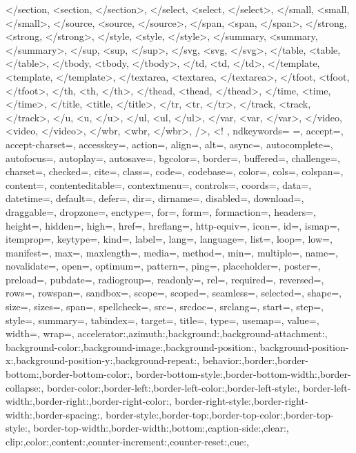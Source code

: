 {{    </section, <section, </section>,
    </select, <select, </select>,
    </small, <small, </small>,
    </source, <source, </source>,
    </span, <span, </span>,
    </strong, <strong, </strong>,
    </style, <style, </style>,
    </summary, <summary, </summary>,
    </sup, <sup, </sup>,
    </svg, <svg, </svg>,
    </table, <table, </table>,
    </tbody, <tbody, </tbody>,
    </td, <td, </td>,
    </template, <template, </template>,
    </textarea, <textarea, </textarea>,
    </tfoot, <tfoot, </tfoot>,
    </th, <th, </th>,
    </thead, <thead, </thead>,
    </time, <time, </time>,
    </title, <title, </title>,
    </tr, <tr, </tr>,
    </track, <track, </track>,
    </u, <u, </u>,
    </ul, <ul, </ul>,
    </var, <var, </var>,
    </video, <video, </video>,
    </wbr, <wbr, </wbr>,
    />, <!
    },  
    ndkeywords={
    =,
    accept=, accept-charset=, accesskey=, action=, align=, alt=, async=, autocomplete=, autofocus=, autoplay=, autosave=, bgcolor=, border=, buffered=, challenge=, charset=, checked=, cite=, class=, code=, codebase=, color=, cols=, colspan=, content=, contenteditable=, contextmenu=, controls=, coords=, data=, datetime=, default=, defer=, dir=, dirname=, disabled=, download=, draggable=, dropzone=, enctype=, for=, form=, formaction=, headers=, height=, hidden=, high=, href=, hreflang=, http-equiv=, icon=, id=, ismap=, itemprop=, keytype=, kind=, label=, lang=, language=, list=, loop=, low=, manifest=, max=, maxlength=, media=, method=, min=, multiple=, name=, novalidate=, open=, optimum=, pattern=, ping=, placeholder=, poster=, preload=, pubdate=, radiogroup=, readonly=, rel=, required=, reversed=, rows=, rowspan=, sandbox=, scope=, scoped=, seamless=, selected=, shape=, size=, sizes=, span=, spellcheck=, src=, srcdoc=, srclang=, start=, step=, style=, summary=, tabindex=, target=, title=, type=, usemap=, value=, width=, wrap=,
    accelerator:,azimuth:,background:,background-attachment:,
    background-color:,background-image:,background-position:,
    background-position-x:,background-position-y:,background-repeat:,
    behavior:,border:,border-bottom:,border-bottom-color:,
    border-bottom-style:,border-bottom-width:,border-collapse:,
    border-color:,border-left:,border-left-color:,border-left-style:,
    border-left-width:,border-right:,border-right-color:,
    border-right-style:,border-right-width:,border-spacing:,
    border-style:,border-top:,border-top-color:,border-top-style:,
    border-top-width:,border-width:,bottom:,caption-side:,clear:,
    clip:,color:,content:,counter-increment:,counter-reset:,cue:,
}}
